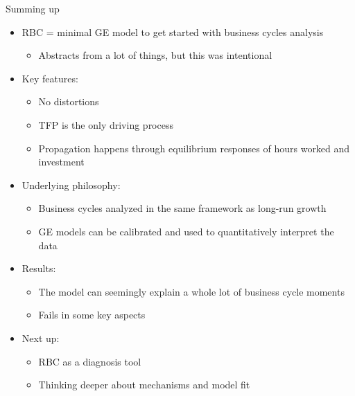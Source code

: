 \documentclass[9pt,xcolor={dvipsnames}]{beamer}
\newcommand{\bit}{\begin{itemize}}
\newcommand{\eit}{\end{itemize}}
\begin{document}
\begin{frame}{Summing up}

\bit
\setlength\itemsep{1.5em} 

\item RBC = minimal GE model to get started with business cycles analysis
\bit
	\item Abstracts from a lot of things, but this was intentional
\eit

\item Key features: 
\bit
	\item No distortions
	\item TFP is the only driving process
	\item Propagation happens through equilibrium responses of hours worked and investment
\eit

\item Underlying philosophy:
\bit
	\item Business cycles analyzed in the same framework as long-run growth
	\item GE models can be calibrated and used to quantitatively interpret the data
\eit

\item Results:
\bit
	\item The model can seemingly explain a whole lot of business cycle moments
	\item Fails in some key aspects
\eit

\item Next up:
\bit
	\item RBC as a diagnosis tool
	\item Thinking deeper about mechanisms and model fit
\eit

\eit

\end{frame}
\end{document}
